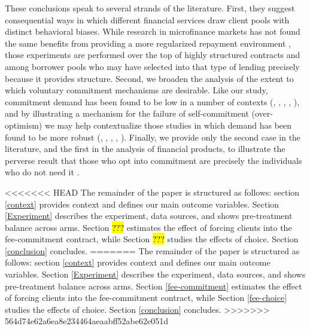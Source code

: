 \documentclass[oneside,11pt]{article}
\begin{document}
These conclusions speak to several strands of the literature.  First, they suggest consequential ways in which different financial services draw client pools with distinct behavioral biases.  While research in microfinance markets has not found the same benefits from providing a more regularized repayment environment \citep{Pande}, those experiments are performed over the top of highly structured contracts and among borrower pools who may have selected into that type of lending precisely because it provides structure.  Second, we broaden the analysis of the extent to which voluntary commitment mechanisms are desirable.  Like our study, commitment demand has been found to be low in a number of contexts (\cite{Ashraf}, \cite{Gine}, \cite{Ted}, \cite{Royer}, \cite{Sprenger}), and by illustrating a mechanism for the failure of self-commitment (over-optimism) we may help contextualize those studies in which demand has been found to be more robust (\cite{Kremer},  \cite{Casaburi}, \cite{Alcohol}, \cite{AprajitP&P}, \cite{Pascaline}). Finally, we provide only the second case in the literature, and the first in the analysis of financial products, to illustrate the perverse result that those who opt into commitment are precisely the individuals who do not need it \citep{Sprenger}.


<<<<<<< HEAD
The remainder of the paper is structured as follows:  section \ref{context} provides context and defines our main outcome variables. Section \ref{Experiment} describes the experiment, data sources, and shows pre-treatment balance across arms. Section \hl{???} estimates the effect of forcing clients into the fee-commitment contract, while Section \hl{???} studies the effects of choice. Section \ref{conclusion} concludes.
=======
The remainder of the paper is structured as follows:  section \ref{context} provides context and defines our main outcome variables. Section \ref{Experiment} describes the experiment, data sources, and shows pre-treatment balance across arms. Section \ref{fee-commitment} estimates the effect of forcing clients into the fee-commitment contract, while Section \ref{fee-choice} studies the effects of choice. Section \ref{conclusion} concludes.
>>>>>>> 564d74e62a6ea8e234464aeaabff52abe62e051d




\end{document}
